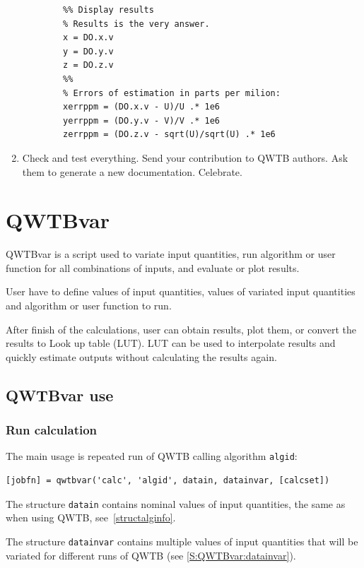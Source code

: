 \documentclass[12pt,a4paper,oneside]{report} %
\newcommand{\li}[1]{\lstinline{#1}}     %
\begin{document}
\begin{enumerate}
\begin{lstlisting}
        %% Display results
        % Results is the very answer.
        x = DO.x.v
        y = DO.y.v
        z = DO.z.v
        %%
        % Errors of estimation in parts per milion:
        xerrppm = (DO.x.v - U)/U .* 1e6
        yerrppm = (DO.y.v - V)/V .* 1e6
        zerrppm = (DO.z.v - sqrt(U)/sqrt(U) .* 1e6
        \end{lstlisting} %

        \item Check and test everything. Send your contribution to QWTB authors. Ask them to
        generate a new documentation. Celebrate.

\end{enumerate}

\chapter{QWTBvar} %
QWTBvar is a script used to variate input quantities, run algorithm or user
function for all combinations of inputs, and evaluate or plot results.

User have to define values of input quantities, values of variated input
quantities and algorithm or user function to run.

After finish of the calculations, user can obtain results, plot them, or
convert the results to Look up table (LUT). LUT can be used to interpolate
results and quickly estimate outputs without calculating the results again.

\section{QWTBvar use} %
\subsection{Run calculation}
\label{S:QWTBvar:calc}
The main usage is repeated run of QWTB calling algorithm \li{algid}:
\begin{lstlisting}
[jobfn] = qwtbvar('calc', 'algid', datain, datainvar, [calcset])
\end{lstlisting}
The structure \li{datain} contains nominal values of input quantities,
the same as when using QWTB, see~\ref{structalginfo}.

The structure \li{datainvar} contains multiple values of input quantities that
will be variated for different runs of QWTB (see \ref{S:QWTBvar:datainvar}).
\end{document}
